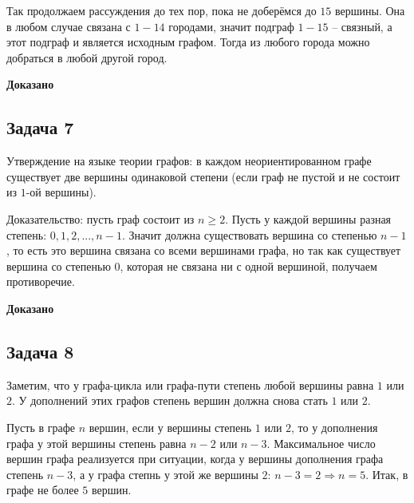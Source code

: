 \documentclass[a4paper,12pt]{article} %
\begin{document}
Так продолжаем рассуждения до тех пор, пока не доберёмся до $15$ вершины. Она в любом случае связана с $1-14$ городами, значит подграф $1-15$ -- связный, а этот подграф и является исходным графом. Тогда из любого города можно добраться в любой другой город.

\begin{flushright}
\begin{large}
\textbf {Доказано}
\end{large}
\end{flushright}

\begin{center}
\section*{Задача 7}
\end{center}

Утверждение на языке теории графов: в каждом неориентированном графе существует две вершины одинаковой степени (если граф не пустой и не состоит из $1$-ой вершины).

Доказательство: пусть граф состоит из $n \geqslant 2$. Пусть у каждой вершины разная степень: $0, 1, 2, ..., n-1$. Значит должна существовать вершина со степенью $n-1$, то есть это вершина связана со всеми вершинами графа, но так как существует вершина со степенью $0$, которая не связана ни с одной вершиной, получаем противоречие.

\begin{flushright}
\begin{large}
\textbf {Доказано}
\end{large}
\end{flushright}

\newpage
\begin{center}
\section*{Задача 8}
\end{center}

Заметим, что у графа-цикла или графа-пути степень любой вершины равна $1$ или $2$. У дополнений этих графов степень вершин должна снова стать $1$ или $2$.

Пусть в графе $n$ вершин, если у вершины степень $1$ или $2$, то у дополнения графа у этой вершины степень равна $n-2$ или $n-3$. Максимальное число вершин графа реализуется при ситуации, когда у вершины дополнения графа степень $n-3$, а у графа степнь у этой же вершины $2$: $n-3 = 2 \Rightarrow n= 5$. Итак, в графе не более $5$ вершин.
\end{document}
